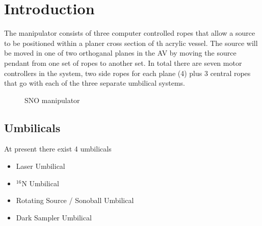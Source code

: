 

\chapter{Introduction}

 
  
  The manipulator consists of three computer controlled ropes that allow
a source to be positioned within a planer cross section of th acrylic
vessel.  
The source will be moved in one of two orthoganal planes in the
AV by moving the source pendant from one set of ropes to another set.
In total there are seven motor controllers in the system, two side ropes
for each plane (4) plus 3 central ropes that go with each of the three
separate umbilical systems.
\begin{figure}[htbp]
\begin{center}
\leavevmode
\epsfxsize=7in
\caption[SNO manipulator]{SNO manipulator
  }
\end{center}
\end{figure}
  
\section{Umbilicals}
  
  At present there exist 4 umbilicals
\begin{itemize}
\item Laser Umbilical
\item $^{16}$N Umbilical
\item Rotating Source / Sonoball Umbilical
\item Dark Sampler Umbilical
\end{itemize}
  
  
